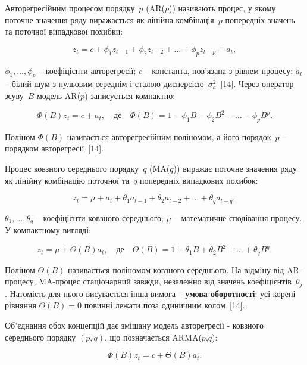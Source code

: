 \documentclass{bachelor_thesis}
\begin{document}
Авторегресійним процесом порядку~$p$ (AR($p$)) називають процес, у якому поточне значення ряду виражається як лінійна комбінація~$p$ попередніх значень та поточної випадкової похибки:

\begin{equation*}
z_t = c + \phi_1 z_{t-1} + \phi_2 z_{t-2} + \ldots + \phi_p z_{t-p} + a_t,
\end{equation*}

 $\phi_1, \ldots, \phi_p$ -- коефіцієнти авторегресії; $c$ -- константа, пов'язана з рівнем процесу; $a_t$ -- білий шум з нульовим середнім і сталою дисперсією~$\sigma_a^2$~[14]. Через оператор зсуву~$B$ модель AR($p$) записується компактно:

\begin{equation*}
\Phi(B) z_t = c + a_t, \quad \text{де} \quad \Phi(B) = 1 - \phi_1 B - \phi_2 B^2 - \ldots - \phi_p B^p.
\end{equation*}

Поліном $\Phi(B)$ називається авторегресійним поліномом, а його порядок~$p$ -- порядком авторегресії~[14].

Процес ковзного середнього порядку~$q$ (MA($q$)) виражає поточне значення ряду як лінійну комбінацію поточної та~$q$ попередніх випадкових похибок:

\begin{equation*}
z_t = \mu + a_t + \theta_1 a_{t-1} + \theta_2 a_{t-2} + \ldots + \theta_q a_{t-q},
\end{equation*}

 $\theta_1, \ldots, \theta_q$ -- коефіцієнти ковзного середнього; $\mu$ -- математичне сподівання процесу. У компактному вигляді:

\begin{equation*}
z_t = \mu + \Theta(B) a_t, \quad \text{де} \quad \Theta(B) = 1 + \theta_1 B + \theta_2 B^2 + \ldots + \theta_q B^q.
\end{equation*}

Поліном $\Theta(B)$ називається поліномом ковзного середнього. На відміну від AR-процесу, MA-процес стаціонарний завжди, незалежно від значень коефіцієнтів~$\theta_j$. Натомість для нього висувається інша вимога -- \textbf{умова оборотності}: усі корені рівняння $\Theta(B) = 0$ повинні лежати поза одиничним колом~[14].

Об'єднання обох концепцій дає змішану модель авторегресії - ковзного середнього порядку $(p, q)$, що позначається ARMA($p$,$q$):

\begin{equation*}
\Phi(B) z_t = c + \Theta(B) a_t.
\end{equation*}
\end{document}
